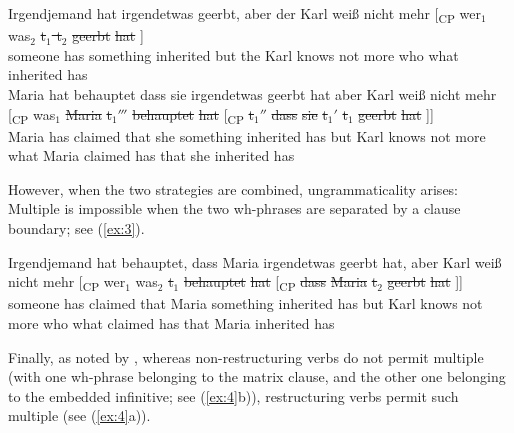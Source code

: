 \documentclass[output=paper]{langsci/langscibook}
\begin{document}
\ea\label{dg534} 
    \ea \gll Irgendjemand \label{dg534a}hat irgendetwas geerbt, aber der Karl
    wei{\ss} nicht mehr [\textsubscript{CP} wer$_1$ was$_2$ \sout{t$_1$ t$_2$} \sout{geerbt} \sout{hat} ]\\
        someone has something inherited but the Karl knows not more {} who what {} inherited has \\
    \ex  \gll Maria hat behauptet dass sie irgendetwas geerbt hat aber Karl wei{\ss} nicht mehr [\textsubscript{CP} was$_1$ \sout{Maria} \sout{t$_1'''$} \sout{behauptet} \sout{hat} [\textsubscript{CP} \sout{t$_1''$} \sout{dass} \sout{sie} \sout{t$_1'$} \sout{t$_1$} \sout{geerbt} \sout{hat} ]]\\
        Maria has claimed that she something inherited has but Karl knows not more {} what Maria {} claimed has \hspace{0mm} \hspace{0mm} that she {} \hspace{0mm} inherited has \\
    \z
\z

However, when the two strategies are combined, ungrammaticality
arises: Multiple  is impossible when the two wh-phrases are
separated by a clause boundary; see (\ref{ex:3}).\newpage

\ea {}
    \gll \llap{*}Irgendjemand \label{unlod28}hat behauptet, dass Maria irgendetwas geerbt
hat, aber Karl wei{\ss} nicht mehr [\textsubscript{CP} wer$_1$ was$_2$
 \sout{t$_1$} \sout{behauptet} \sout{hat} [\textsubscript{CP}
\sout{dass} \sout{Maria} \sout{t$_2$} \sout{geerbt}
\sout{hat} ]] \\
someone has claimed that Maria something inherited has but
Karl knows not more {} who what \hspace{0mm} claimed has
\hspace{0mm} that Maria \hspace{0mm} inherited has \\\label{ex:3}
\z

Finally, as noted by \cite{Sauerland:99:loc}, whereas non-restructuring verbs
do not permit multiple  (with one wh-phrase belonging to the matrix
clause, and the other one belonging to the embedded infinitive; see
(\ref{ex:4}b)), restructuring verbs permit such multiple  (see
(\ref{ex:4}a)).

\ea\label{ex:4} 
    \z
\z
\end{document}

